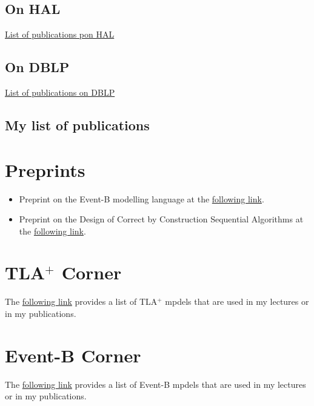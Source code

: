 \documentclass[ 12pt]{article}
\begin{document}
\subsection{On HAL}


 \href{https://haltools.inria.fr/Public/afficheRequetePubli.php?auteur_exp=dominique%2Cmery&annee_publideb=1980&annee_publifin=2024&CB_auteur=oui&CB_titre=oui&CB_article=oui&langue=Anglais&tri_exp=annee_publi&tri_exp2=typdoc&tri_exp3=date_publi&ordre_aff=TA&Fen=Aff&css=../css/VisuRubriqueEncadre.css}{List
   of publications pon HAL}

\subsection{On DBLP }
  \href{https://dblp.org/pid/51/6932.html}{List
   of publications on  DBLP }

 

 \subsection{My list of publications}
%
%




\section{Preprints}
\label{sec:documents}

\begin{itemize}

\item Preprint on the Event-B modelling language  at the 
  \href{http://mery54.github.io/mery/publications/preprint-chaptereventb.pdf}{following     link}. 

  \item Preprint on the Design of Correct by Construction Sequential
   Algorithms  at the 
  \href{http://mery54.github.io/mery/publications/preprint-chapterseqalgo.pdf}{following     link}. 

\end{itemize}

\section{TLA$^+$ Corner}
\label{sec:tla+-corner}

 The  \href{http://mery54.github.io/mery/tla/}{following
   link} provides a list of TLA$^+$ mpdels that are  used in my
 lectures or in my publications. 


\section{Event-B Corner}
\label{sec:tla+-corner}

 The  \href{http://mery54.github.io/mery/eventb/}{following
   link} provides a list of  Event-B mpdels that are  used in my
 lectures or in my publications. 
\end{document}
